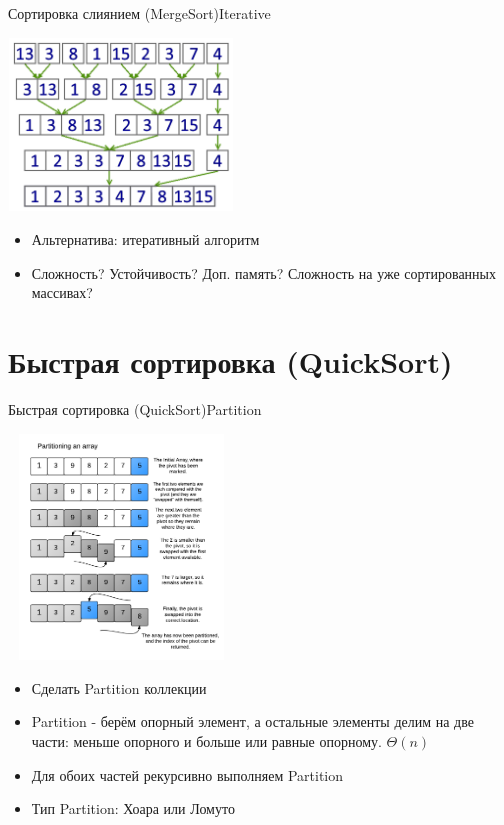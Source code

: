 \documentclass[10pt]{beamer}
\begin{document}
\begin{frame}[fragile]{Сортировка слиянием (MergeSort)}{Iterative}
\begin{multicols}{2}
\includegraphics[width=6cm, height=4.6cm]{Term_1/Source/Pirctures/Merge_sort_itearative.png}\\
\vfill\eject
\begin{itemize}
    \item Альтернатива: итеративный алгоритм
    \item Сложность? Устойчивость? Доп. память? Сложность на уже сортированных массивах? 
\end{itemize}
\end{multicols}
\end{frame}

\section{Быстрая сортировка (QuickSort)}
\begin{frame}[fragile]{Быстрая сортировка (QuickSort)}{Partition}
\begin{multicols}{2}
\includegraphics[width=6cm, height=6cm]{Term_1/Source/Pirctures/qs1.png}\\
\vfill\eject
\begin{itemize}
    \item Сделать Partition коллекции
    \item Partition - берём опорный элемент, а остальные элементы делим на две части: меньше опорного и больше или равные опорному. $\Theta(n)$
    \item Для обоих частей рекурсивно выполняем Partition
    \item Тип Partition: Хоара или Ломуто
\end{itemize}
\end{multicols}
\end{frame}
\end{document}
